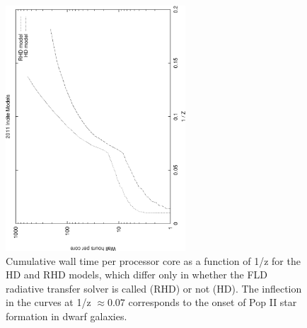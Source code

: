 \begin{figure}[t]
\centerline{\hfill
  \includegraphics[width=0.6\textwidth, angle=-90]{logcost.pdf}
  \hfill}
  \caption{Cumulative wall time per processor core as a function of 1/z for the HD and RHD models, which differ only in whether the FLD 
radiative transfer solver is called (RHD) or not (HD). The inflection in the curves at 1/z $\approx 0.07$ corresponds to the onset of Pop II
star formation in dwarf galaxies. }
  \label{fig:logcost}
\end{figure}

